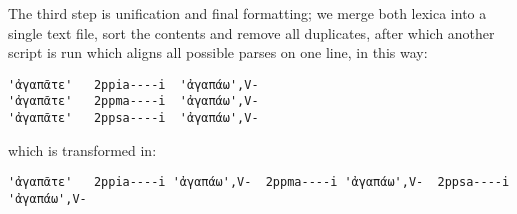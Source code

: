 The third step is unification and final formatting; we merge both lexica into a
single text file, sort the contents and remove all duplicates, after which
another script is run which aligns all possible parses on one line, in this
way:

\lstset{numbers=left,
  escapebegin=\Greek,
  escapeend=\Latin,
    numberstyle=\scriptsize,
    stepnumber=1,
    numbersep=8pt
}

\begin{lstlisting}[firstnumber=1, escapeinside='']
'ἀγαπᾶτε'	2ppia----i	'ἀγαπάω',V-
'ἀγαπᾶτε'	2ppma----i	'ἀγαπάω',V-
'ἀγαπᾶτε'	2ppsa----i	'ἀγαπάω',V-
\end{lstlisting}

which is transformed in:

\begin{lstlisting}[firstnumber=1, escapeinside='']
'ἀγαπᾶτε'	2ppia----i 'ἀγαπάω',V-	2ppma----i 'ἀγαπάω',V-	2ppsa----i 'ἀγαπάω',V-
\end{lstlisting}

